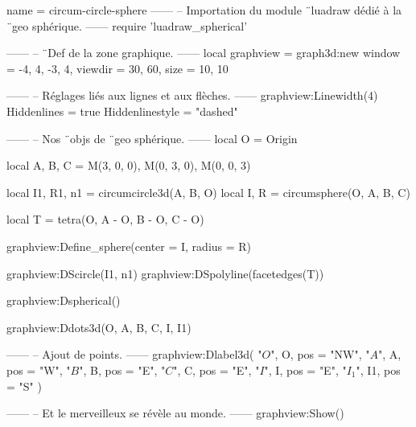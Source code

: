 \documentclass{standalone}
\begin{document}
\begin{luadraw}{name = circum-circle-sphere}
------
-- Importation du module ¨luadraw dédié à la ¨geo sphérique.
------
require 'luadraw_spherical'

------
-- ¨Def de la zone graphique.
------
local graphview = graph3d:new{
  window  = {-4, 4, -3, 4},
  viewdir = {30, 60},
  size    = {10, 10}
}

------
-- Réglages liés aux lignes et aux flèches.
------
graphview:Linewidth(4)
Hiddenlines     = true
Hiddenlinestyle = "dashed"

------
-- Nos ¨objs de ¨geo sphérique.
------
local O = Origin

local A, B, C = M(3, 0, 0), M(0, 3, 0), M(0, 0, 3)

local I1, R1, n1 = circumcircle3d(A, B, O)
local I, R       = circumsphere(O, A, B, C)

local T = tetra(O, A - O, B - O, C - O)

graphview:Define_sphere({center = I, radius = R})

graphview:DScircle({I1, n1})
graphview:DSpolyline(facetedges(T))

graphview:Dspherical()

graphview:Ddots3d({O, A, B, C, I, I1})

------
-- Ajout de points.
------
graphview:Dlabel3d(
  "$O$", O, {pos = "NW"},
  "$A$", A, {pos = "W"},
  "$B$", B, {pos = "E"},
  "$C$", C, {pos = "E"},
  "$I$", I, {pos = "E"},
  "$I_1$", I1, {pos = "S"}
)

------
-- Et le merveilleux se révèle au monde.
------
graphview:Show()
\end{luadraw}
\end{document}
